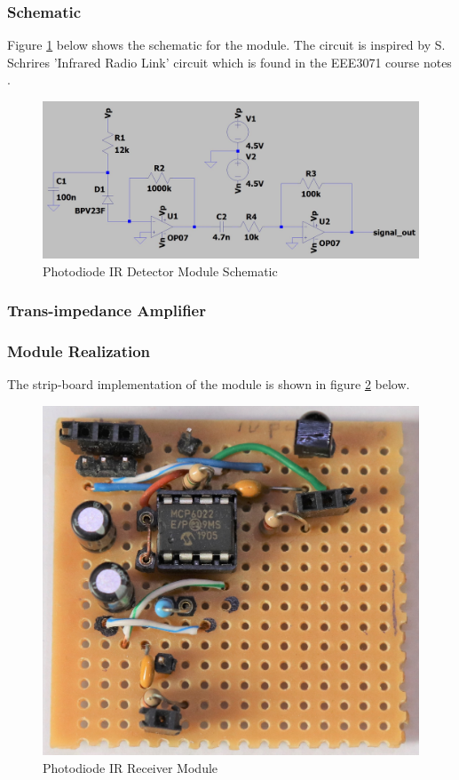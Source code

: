 \subsubsection{Schematic}
Figure \ref{fig:schematic_photodiode_transimpedance} below shows the schematic for the module. The circuit is inspired by S. Schrires 'Infrared Radio Link' circuit which is found in the EEE3071 course notes \cite{Schrire2007}.


\begin{figure}[H]
	\centering
	\includegraphics[width=.8\textwidth]{figures/design/photodiode_transimpedance.JPG}
	\caption{Photodiode IR Detector Module Schematic}
	\label{fig:schematic_photodiode_transimpedance}
\end{figure}

\subsubsection{Trans-impedance Amplifier}


\subsubsection{Module Realization}
The strip-board implementation of the module is shown in figure \ref{fig:module_photodiode_receiver} below.

\begin{figure}[H]
	\centering
	\includegraphics[width=.6\textwidth]{figures/modules/photodiode_receiver.jpg}
	\caption{Photodiode IR Receiver Module}
	\label{fig:module_photodiode_receiver}
\end{figure}


